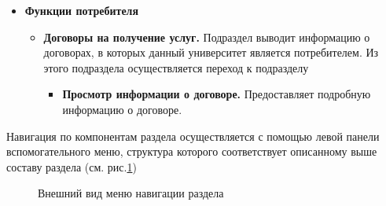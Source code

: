 \begin{itemize}
	\item \textbf{Функции потребителя}
	\begin{itemize}
		\item \textbf{Договоры на получение услуг.} Подраздел выводит информацию о договорах, в которых данный университет является потребителем. Из этого подраздела осуществляется переход к подразделу
		\begin{itemize}
			\item \textbf{Просмотр информации о договоре.} Предоставляет подробную информацию о договоре.
		\end{itemize}
	\end{itemize}
\end{itemize}

Навигация по компонентам раздела осуществляется с помощью левой панели вспомогательного меню, структура которого соответствует описанному выше составу раздела (см. рис.\ref{agreement:menu})
	
	\begin{figure}[H]
	\caption{Внешний вид меню навигации раздела }
	\label{agreement:menu}
	\end{figure}


